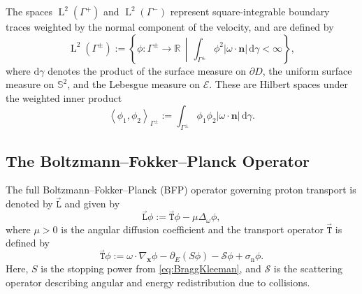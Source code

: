 \documentclass{amsart}
\newcommand{\dd}{{\mathrm d}}
\newcommand{\fT}{\stackrel{_\rightarrow}{\mathtt T}}
\newcommand{\fL}{\stackrel{_\rightarrow}{\mathtt L}}
\theoremstyle{plain}
\renewcommand{\vec}[1]{\ensuremath{\boldsymbol{#1}}}
\newcommand{\leb}{\text{Leb}}
\newcommand{\LL}{\ensuremath{\operatorname L}\xspace}
\renewcommand{\leb}[1]{\ensuremath{\LL^{#1}}}
\newcommand{\ltwop}[2]{\ensuremath{\!\left\langle{#1,#2}\right\rangle}}
\newcommand{\cS}{\ensuremath{\mathscr S}}
\begin{document}
The spaces $\leb{2}(\Gamma^{+})$ and $\leb{2}(\Gamma^{-})$ represent
square-integrable boundary traces weighted by the normal component of
the velocity, and are defined by
\begin{equation}
  \leb{2}(\Gamma^{\pm}) :=
  \left\{
    \phi : \Gamma^{\pm} \to \mathbb{R}
    \,\middle|\,
    \int_{\Gamma^{\pm}} \phi^2 |\omega \cdot \vec{n}| \, \dd \gamma < \infty
  \right\},
\end{equation}
where $\dd \gamma$ denotes the product of the surface measure on
$\partial D$, the uniform surface measure on $\mathbb{S}^2$, and the
Lebesgue measure on $\mathcal{E}$. These are Hilbert spaces under the
weighted inner product
\begin{equation}
  \ltwop{\phi_1}{\phi_2}_{\Gamma^{\pm}} :=
  \int_{\Gamma^{\pm}} \phi_1 \phi_2 |\omega \cdot \vec{n}| \, \dd \gamma.
\end{equation}

\subsection{The Boltzmann--Fokker--Planck Operator}

The full Boltzmann--Fokker--Planck (BFP) operator governing proton
transport is denoted by $\fL$ and given by
\begin{equation}
  \fL \phi := \fT \phi - \mu \Delta_{\omega} \phi,
\end{equation}
where $\mu > 0$ is the angular diffusion coefficient and the transport
operator $\fT$ is defined by
\begin{equation}
  \fT \phi := \omega \cdot \nabla_{\vec{x}} \phi 
  - \partial_E (S \phi) 
  - \cS \phi + \sigma_{\mathrm{n}} \phi.
\end{equation}
Here, $S$ is the stopping power from \eqref{eq:BraggKleeman}, and
$\cS$ is the scattering operator describing angular and energy
redistribution due to collisions.
\end{document}
